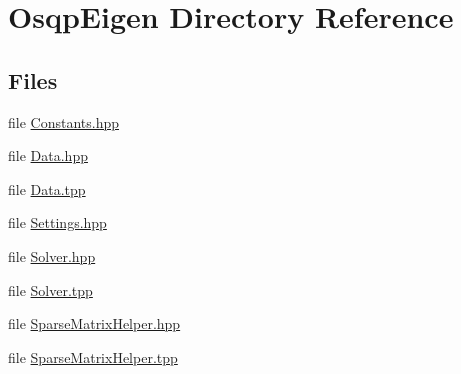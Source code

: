 \section{Osqp\+Eigen Directory Reference}
\label{dir_72f51ea932838d944e375d424b974b5f}
\subsection*{Files}
\begin{DoxyCompactItemize}
\item 
file \hyperlink{Constants_8hpp}{Constants.\+hpp}
\item 
file \hyperlink{Data_8hpp}{Data.\+hpp}
\item 
file \hyperlink{Data_8tpp}{Data.\+tpp}
\item 
file \hyperlink{Settings_8hpp}{Settings.\+hpp}
\item 
file \hyperlink{Solver_8hpp}{Solver.\+hpp}
\item 
file \hyperlink{Solver_8tpp}{Solver.\+tpp}
\item 
file \hyperlink{SparseMatrixHelper_8hpp}{Sparse\+Matrix\+Helper.\+hpp}
\item 
file \hyperlink{SparseMatrixHelper_8tpp}{Sparse\+Matrix\+Helper.\+tpp}
\end{DoxyCompactItemize}
